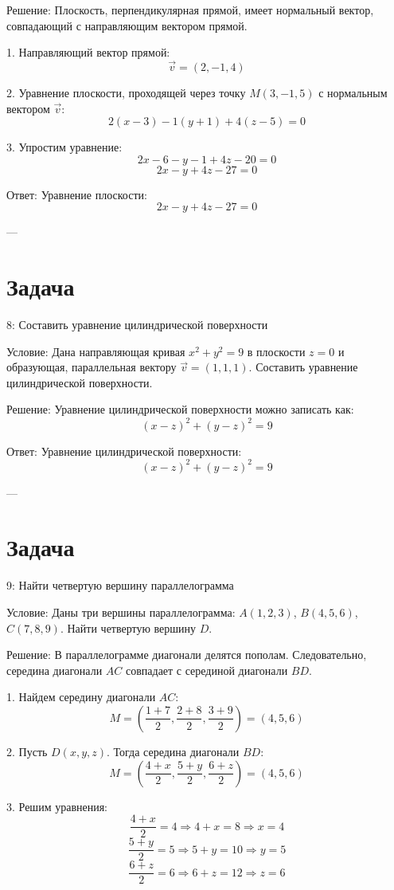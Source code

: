 \documentclass[a4paper,14pt]{extreport} %
\begin{document}
 Решение:   
Плоскость, перпендикулярная прямой, имеет нормальный вектор, совпадающий с направляющим вектором прямой.

1. Направляющий вектор прямой:
   \[
   \vec{v} = (2, -1, 4)
   \]

2. Уравнение плоскости, проходящей через точку \( M(3, -1, 5) \) с нормальным вектором \( \vec{v} \):
   \[
   2(x - 3) - 1(y + 1) + 4(z - 5) = 0
   \]

3. Упростим уравнение:
   \[
   2x - 6 - y - 1 + 4z - 20 = 0
   \]
   \[
   2x - y + 4z - 27 = 0
   \]

 Ответ:   
Уравнение плоскости:
\[
2x - y + 4z - 27 = 0
\]

---

    \section*{Задача}8: Составить уравнение цилиндрической поверхности

 Условие:   
Дана направляющая кривая \( x^2 + y^2 = 9 \) в плоскости \( z = 0 \) и образующая, параллельная вектору \( \vec{v} = (1, 1, 1) \).  
Составить уравнение цилиндрической поверхности.

 Решение:   
Уравнение цилиндрической поверхности можно записать как:
\[
(x - z)^2 + (y - z)^2 = 9
\]

 Ответ:   
Уравнение цилиндрической поверхности:
\[
(x - z)^2 + (y - z)^2 = 9
\]

---

    \section*{Задача}9: Найти четвертую вершину параллелограмма

 Условие:   
Даны три вершины параллелограмма:  
\( A(1, 2, 3) \), \( B(4, 5, 6) \), \( C(7, 8, 9) \).  
Найти четвертую вершину \( D \).

 Решение:   
В параллелограмме диагонали делятся пополам.  
Следовательно, середина диагонали \( AC \) совпадает с серединой диагонали \( BD \).

1. Найдем середину диагонали \( AC \):
   \[
   M = \left( \frac{1 + 7}{2}, \frac{2 + 8}{2}, \frac{3 + 9}{2} \right) = (4, 5, 6)
   \]

2. Пусть \( D(x, y, z) \). Тогда середина диагонали \( BD \):
   \[
   M = \left( \frac{4 + x}{2}, \frac{5 + y}{2}, \frac{6 + z}{2} \right) = (4, 5, 6)
   \]

3. Решим уравнения:
   \[
   \frac{4 + x}{2} = 4 \Rightarrow 4 + x = 8 \Rightarrow x = 4
   \]
   \[
   \frac{5 + y}{2} = 5 \Rightarrow 5 + y = 10 \Rightarrow y = 5
   \]
   \[
   \frac{6 + z}{2} = 6 \Rightarrow 6 + z = 12 \Rightarrow z = 6
   \]
\end{document}
